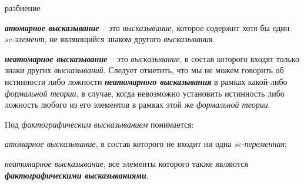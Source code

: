 \begin{SCn}
\begin{scnrelfromset}{разбиение}
\end{scnrelfromset}
\end{SCn}

\textbf{\textit{атомарное высказывание}} -- это \textit{высказывание}, которое содержит хотя бы один \textit{sc-элемент}, не являющийся знаком другого \textit{высказывания}.

\textbf{\textit{неатомарное высказывание}} -- это \textit{высказывание}, в состав которого входят только знаки других \textit{высказываний}. Следует отметить, что мы не можем говорить об истинности либо ложности \textbf{\textit{неатомарного высказывания}} в рамках какой-либо \textit{формальной теории}, в случае, когда невозможно установить истинность либо ложность любого из его элементов в рамках этой же \textit{формальной теории}.

Под \textit{фактографическим высказыванием} понимается:
\begin{textitemize}
	\item \textit{атомарное высказывание}, в состав которого не входит ни одна \textit{sc-переменная};
	\item \textit{неатомарное высказывание}, все элементы которого также являются \textbf{\textit{фактографическими высказываниями}}.
\end{textitemize}

